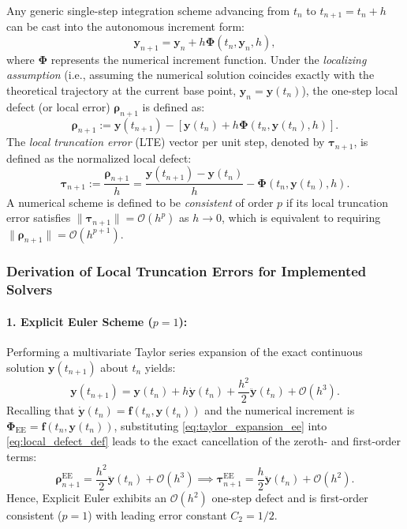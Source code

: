 \documentclass[11pt,a4paper]{article}
\theoremstyle{definition}
\theoremstyle{remark}
\begin{document}
Any generic single-step integration scheme advancing from $t_n$ to $t_{n+1} = t_n + h$ can be cast into the autonomous increment form:
\begin{equation}
\label{eq:general_increment_function}
\mathbf{y}_{n+1} = \mathbf{y}_n + h \mathbf{\Phi}(t_n, \mathbf{y}_n, h),
\end{equation}
where $\mathbf{\Phi}$ represents the numerical increment function. Under the \emph{localizing assumption} (i.e., assuming the numerical solution coincides exactly with the theoretical trajectory at the current base point, $\mathbf{y}_n = \mathbf{y}(t_n)$), the one-step local defect (or local error) $\boldsymbol{\rho}_{n+1}$ is defined as:
\begin{equation}
\label{eq:local_defect_def}
\boldsymbol{\rho}_{n+1} := \mathbf{y}(t_{n+1}) - \left[ \mathbf{y}(t_n) + h \mathbf{\Phi}(t_n, \mathbf{y}(t_n), h) \right].
\end{equation}
The \emph{local truncation error} (LTE) vector per unit step, denoted by $\boldsymbol{\tau}_{n+1}$, is defined as the normalized local defect:
\begin{equation}
\label{eq:lte_def}
\boldsymbol{\tau}_{n+1} := \frac{\boldsymbol{\rho}_{n+1}}{h} = \frac{\mathbf{y}(t_{n+1}) - \mathbf{y}(t_n)}{h} - \mathbf{\Phi}(t_n, \mathbf{y}(t_n), h).
\end{equation}
A numerical scheme is defined to be \emph{consistent} of order $p$ if its local truncation error satisfies $\|\boldsymbol{\tau}_{n+1}\| = \mathcal{O}(h^p)$ as $h \to 0$, which is equivalent to requiring $\|\boldsymbol{\rho}_{n+1}\| = \mathcal{O}(h^{p+1})$.

\subsubsection{Derivation of Local Truncation Errors for Implemented Solvers}
\paragraph{1. Explicit Euler Scheme ($p=1$):}
Performing a multivariate Taylor series expansion of the exact continuous solution $\mathbf{y}(t_{n+1})$ about $t_n$ yields:
\begin{equation}
\label{eq:taylor_expansion_ee}
\mathbf{y}(t_{n+1}) = \mathbf{y}(t_n) + h \dot{\mathbf{y}}(t_n) + \frac{h^2}{2} \ddot{\mathbf{y}}(t_n) + \mathcal{O}(h^3).
\end{equation}
Recalling that $\dot{\mathbf{y}}(t_n) = \mathbf{f}(t_n, \mathbf{y}(t_n))$ and the numerical increment is $\mathbf{\Phi}_{\text{EE}} = \mathbf{f}(t_n, \mathbf{y}(t_n))$, substituting \eqref{eq:taylor_expansion_ee} into \eqref{eq:local_defect_def} leads to the exact cancellation of the zeroth- and first-order terms:
\begin{equation}
\label{eq:euler_defect_expansion}
\boldsymbol{\rho}_{n+1}^{\text{EE}} = \frac{h^2}{2} \ddot{\mathbf{y}}(t_n) + \mathcal{O}(h^3) \implies \boldsymbol{\tau}_{n+1}^{\text{EE}} = \frac{h}{2} \ddot{\mathbf{y}}(t_n) + \mathcal{O}(h^2).
\end{equation}
Hence, Explicit Euler exhibits an $\mathcal{O}(h^2)$ one-step defect and is first-order consistent ($p=1$) with leading error constant $C_2 = 1/2$.
\end{document}
